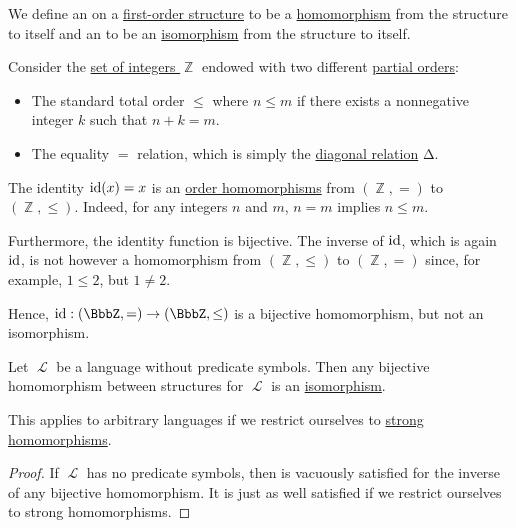 \begin{definition}\label{def:first_order_automorphism}
  We define an  on a \hyperref[def:first_order_structure]{first-order structure} to be a \hyperref[def:first_order_homomorphism]{homomorphism} from the structure to itself and an  to be an \hyperref[def:first_order_isomorphism]{isomorphism} from the structure to itself.
\end{definition}

\begin{example}\label{ex:bijective_order_homomorphism_not_isomorphism}
  Consider the \hyperref[def:integers]{set of integers \( \BbbZ \)} endowed with two different \hyperref[def:partially_ordered_set]{partial orders}:
  \begin{itemize}
    \item The standard total order \( \leq \) where \( n \leq m \) if there exists a nonnegative integer \( k \) such that \( n + k = m \).
    \item The equality \( = \) relation, which is simply the \hyperref[def:binary_relation/diagonal]{diagonal relation} \( \increment \).
  \end{itemize}

  The identity \( \operatorname{id}(x) = x \) is an \hyperref[def:order_homomorphism]{order homomorphisms} from \( (\BbbZ, =) \) to \( (\BbbZ, \leq) \). Indeed, for any integers \( n \) and \( m \), \( n = m \) implies \( n \leq m \).

  Furthermore, the identity function is bijective. The inverse of \( \operatorname{id} \), which is again \( \operatorname{id} \), is not however a homomorphism from \( (\BbbZ, \leq) \) to \( (\BbbZ, =) \) since, for example, \( 1 \leq 2 \), but \( 1 \neq 2 \).

  Hence, \( \id: (\BbbZ, =) \to (\BbbZ, \leq) \) is a bijective homomorphism, but not an isomorphism.
\end{example}

\begin{proposition}\label{thm:automorphism_without_predicate_symbols}
  Let \( \mscrL \) be a language without predicate symbols. Then any bijective homomorphism between structures for \( \mscrL \) is an \hyperref[def:first_order_isomorphism]{isomorphism}.

  This applies to arbitrary languages if we restrict ourselves to \hyperref[rem:first_order_strong_homomorphism]{strong homomorphisms}.
\end{proposition}
\begin{proof}
  If \( \mscrL \) has no predicate symbols, then  is vacuously satisfied for the inverse of any bijective homomorphism. It is just as well satisfied if we restrict ourselves to strong homomorphisms.
\end{proof}

